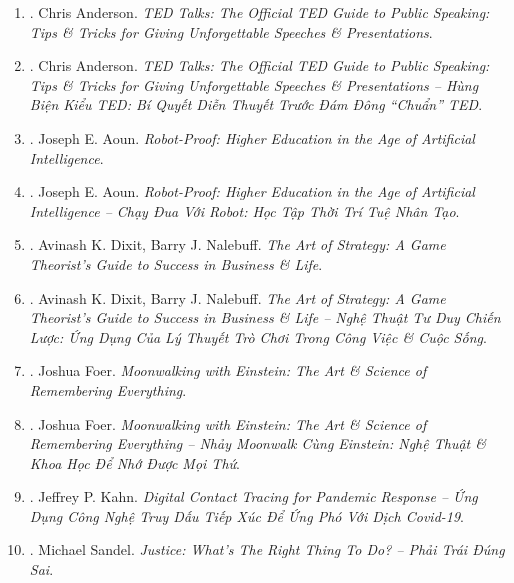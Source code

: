 \documentclass{article}
\begin{document}
\begin{enumerate}
	\item \cite{Anderson_TED}. {\sc Chris Anderson}. {\it TED Talks: The Official TED Guide to Public Speaking: Tips \& Tricks for Giving Unforgettable Speeches \& Presentations}.\hfill{\sf[reading]}
	
	\item \cite{Anderson_TED_VN}. {\sc Chris Anderson}. {\it TED Talks: The Official TED Guide to Public Speaking: Tips \& Tricks for Giving Unforgettable Speeches \& Presentations -- Hùng Biện Kiểu TED: Bí Quyết Diễn Thuyết Trước Đám Đông ``Chuẩn'' TED}.\hfill{\sf[done]}
	
	\item \cite{Aoun_robot-proof}. {\sc Joseph E. Aoun}. {\it Robot-Proof: Higher Education in the Age of Artificial Intelligence}.
	
	\item \cite{Aoun_robot-proof_VN}. {\sc Joseph E. Aoun}. {\it Robot-Proof: Higher Education in the Age of Artificial Intelligence -- Chạy Đua Với Robot: Học Tập Thời Trí Tuệ Nhân Tạo}.\hfill{\sf[done]}
	
	\item \cite{Dixit_Nalebuff2010}. Avinash K. Dixit, Barry J. Nalebuff. {\it The Art of Strategy: A Game Theorist's Guide to Success in Business \& Life}.
	
	\item \cite{Dixit_Nalebuff_strategy}. Avinash K. Dixit, Barry J. Nalebuff. {\it The Art of Strategy: A Game Theorist's Guide to Success in Business \& Life -- Nghệ Thuật Tư Duy Chiến Lược: Ứng Dụng Của Lý Thuyết Trò Chơi Trong Công Việc \& Cuộc Sống}.\hfill{\sf[done]}
		
	\item \cite{Foer_remember}. Joshua Foer. {\it Moonwalking with Einstein: The Art \& Science of Remembering Everything}.
	
	\item \cite{Foer_remember_VN}. Joshua Foer. {\it Moonwalking with Einstein: The Art \& Science of Remembering Everything -- Nhảy Moonwalk Cùng Einstein: Nghệ Thuật \& Khoa Học Để Nhớ Được Mọi Thứ}.\hfill{\sf[done]}
	
	\item \cite{Kahn_diginal_pandemic_VN}. Jeffrey P. Kahn. {\it Digital Contact Tracing for Pandemic Response -- Ứng Dụng Công Nghệ Truy Dấu Tiếp Xúc Để Ứng Phó Với Dịch Covid-19}.\hfill{\sf[done]}
	
	\item \cite{Sandel_justice}. Michael Sandel. {\it Justice: What's The Right Thing To Do? -- Phải Trái Đúng Sai}.\hfill{\sf[done]}
	

\end{enumerate}
\end{document}
